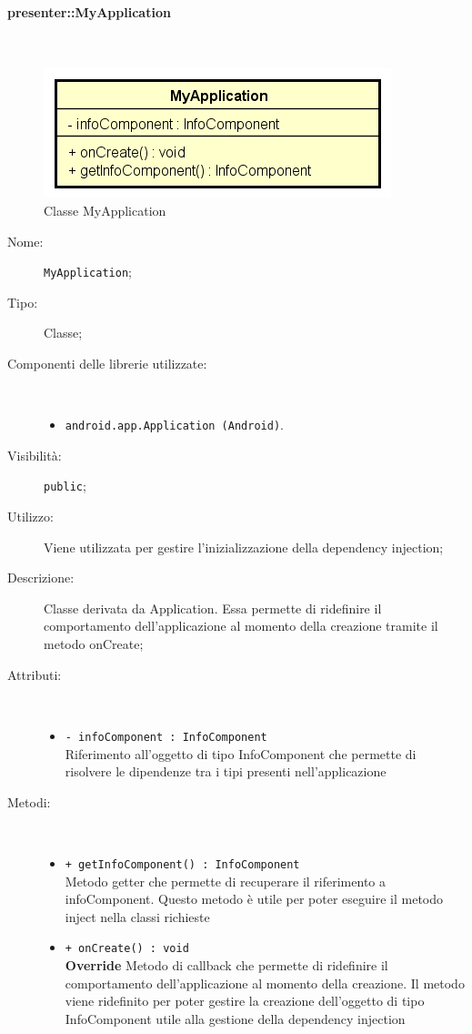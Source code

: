 \documentclass[../DefinizioneDiProdotto.tex]{subfiles}
\begin{document}
\paragraph{presenter::MyApplication}
\
\begin{figure}[H]
	\centering
	\includegraphics[width=\maxwidth]{img/MyApplication.png}
	\caption{Classe MyApplication}\label{fig:presenter::MyApplication} 
\end{figure}
\begin{description}
	\item[Nome:] \texttt{MyApplication};
	\item[Tipo:] Classe;
	\item[Componenti delle librerie utilizzate:] \
\begin{itemize}
\item \texttt{android.app.Application (Android)}.
\end{itemize}
	\item[Visibilità:] \texttt{public};
	\item[Utilizzo:] Viene utilizzata per gestire l'inizializzazione della dependency injection;
	\item[Descrizione:] Classe derivata da Application. Essa permette di ridefinire il comportamento dell'applicazione al momento della creazione tramite il metodo onCreate;
	\item[Attributi:] \
	\begin{itemize}
		\item \texttt{- infoComponent : InfoComponent}\\
		Riferimento all'oggetto di tipo InfoComponent che permette di risolvere le dipendenze tra i tipi presenti nell'applicazione
		
	\end{itemize}
	\item[Metodi:] \
	\begin{itemize}
		\item \texttt{+ getInfoComponent() : InfoComponent}\\
		Metodo getter che permette di recuperare il riferimento a infoComponent. Questo metodo è utile per poter eseguire il metodo inject nella classi richieste
		\item \texttt{+ onCreate() : void}\\
		\textbf{Override} Metodo di callback che permette di ridefinire il comportamento dell'applicazione al momento della creazione. Il metodo viene ridefinito per poter gestire la creazione dell'oggetto di tipo InfoComponent utile alla gestione della dependency injection
	\end{itemize}
\end{description}
\end{document}
